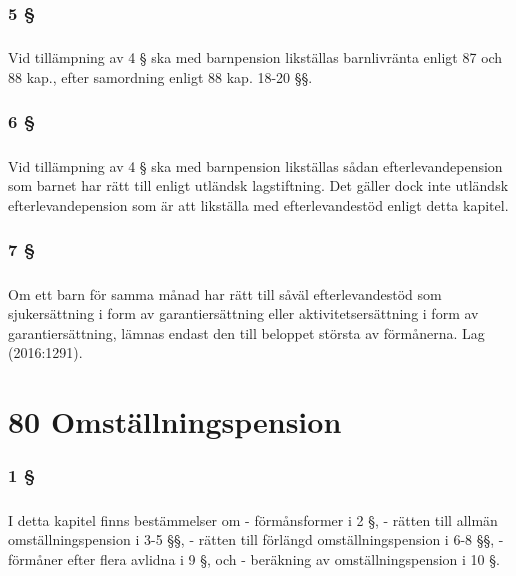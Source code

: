 \documentclass[a4paper,notitlepage,openany,10pt]{book}
\begin{document}
\subsection*{5 §}
\paragraph*{}
Vid tillämpning av 4 § ska med barnpension likställas barnlivränta enligt 87 och 88 kap., efter samordning enligt 88 kap. 18-20 §§.
\subsection*{6 §}
\paragraph*{}
Vid tillämpning av 4 § ska med barnpension likställas sådan efterlevandepension som barnet har rätt till enligt utländsk lagstiftning. Det gäller dock inte utländsk efterlevandepension som är att likställa med efterlevandestöd enligt detta kapitel.
\subsection*{7 §}
\paragraph*{}
Om ett barn för samma månad har rätt till såväl efterlevandestöd som sjukersättning i form av garantiersättning eller aktivitetsersättning i form av garantiersättning, lämnas endast den till beloppet största av förmånerna.
Lag (2016:1291).
\chapter*{80 Omställningspension}
\subsection*{1 §}
\paragraph*{}
I detta kapitel finns bestämmelser om
\newline - förmånsformer i 2 §,
\newline - rätten till allmän omställningspension i 3-5 §§,
\newline - rätten till förlängd omställningspension i 6-8 §§,
\newline - förmåner efter flera avlidna i 9 §, och
\newline - beräkning av omställningspension i 10 §.
\end{document}
